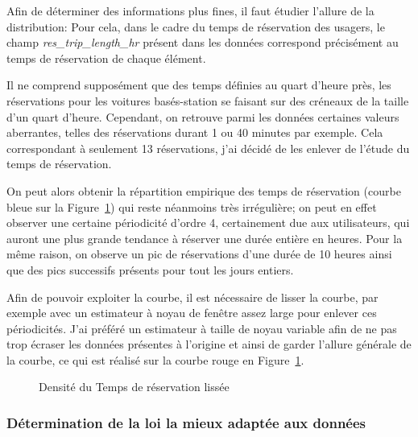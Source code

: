 \documentclass[12pt,a4paper]{article}
\newcommand{\1}[1]{\mathbbm{1}_{\{#1\}} }
\theoremstyle{definition}
\begin{document}
{Afin de déterminer des informations plus fines, il faut étudier l'allure de la distribution:
Pour cela, dans le cadre du temps de réservation des usagers, le champ \emph{res\_trip\_length\_hr} présent dans les données correspond précisément au temps de réservation de chaque élément.

Il ne comprend supposément que des temps définies au quart d'heure près, les réservations pour les voitures basés-station se faisant sur des créneaux de la taille d'un quart d'heure. Cependant, on retrouve parmi les données certaines valeurs aberrantes, telles des réservations durant 1 ou 40 minutes par exemple.  Cela correspondant à seulement 13 réservations, j'ai décidé de les enlever de l'étude du temps de réservation.

On peut alors obtenir la répartition empirique des temps de réservation (courbe bleue sur la Figure~\ref{lissage_courbe}) qui reste néanmoins très irrégulière; on peut en effet observer une certaine périodicité d'ordre 4, certainement due aux utilisateurs, qui auront une plus grande tendance à réserver une durée entière en heures. Pour la même raison, on observe un pic de réservations d'une durée de 10 heures ainsi que des pics successifs présents pour tout les jours entiers.

Afin de pouvoir exploiter la courbe, il est nécessaire de lisser la courbe, par exemple avec un estimateur à noyau de fenêtre assez large pour enlever ces périodicités. J'ai préféré un estimateur à taille de noyau variable afin de ne pas trop écraser les données présentes à l'origine et ainsi de garder l'allure générale de la courbe, ce qui est réalisé sur la courbe rouge en Figure~\ref{lissage_courbe}.


\begin{figure} [h]
\centering
{}
\caption{Densité du Temps de réservation lissée}
\label{lissage_courbe}
\end{figure}


\subsubsection{Détermination de la loi la mieux adaptée aux données}

}
\end{document}
